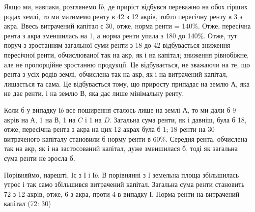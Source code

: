 Якщо ми, навпаки, розглянемо І$b$, де приріст відбувся переважно на обох
гірших родах землі, то ми матимемо ренту в 42 з 12 акрів, тобто
пересічну ренту в 3 з акра. Ввесь витрачений капітал є 30,
отже, норма ренти = 140\%. Отже, пересічна рента з акра зменшилась на 1, а норма ренти упала з 180 до 140\%. Отже, тут поруч з зростанням
загальної суми ренти з 18 до 42 відбувається зниження
пересічної ренти, обчислюваної так на акр, як і на капітал; зниження рівнобіжне,
але не пропорційне зростанню продукції. Це відбувається, не зважаючи на те,
що рента з усіх родів землі, обчислена так на акр, як і на витрачений капітал,
лишається та сама. Це відбувається тому, що  приросту припадає на
землю $А$, яка не дає ренти, і на землю $В$, яка дає лише мінімальну ренту.

Коли б у випадку І$b$ все поширення сталось лише на землі $А$, то ми
дали б 9 акрів на $А$, 1 на $В$, 1 на $C$ і 1 на $D$. Загальна сума ренти, як і давніш,
була б 18, отже, пересічна рента з акра на цих 12 акрах
була б 1; 18 ренти на 30 витраченого капіталу
становили б норму ренти в 60\%. Середня рента, обчислена так на акр,
як і на застосований капітал, дуже зменшилася б, тоді як загальна сума ренти
не зросла б.

Порівняймо, нарешті, І$с$ з І і І$b$. В порівнянні з І земельна площа збільшилась
утроє і так само збільшився витрачений капітал. Загальна сума ренти
становить 72 з 12 акрів, отже, 6 з акра, проти 4 в випадку І. Норма ренти на витрачений капітал (72: 30)
\parbreak{}  %
